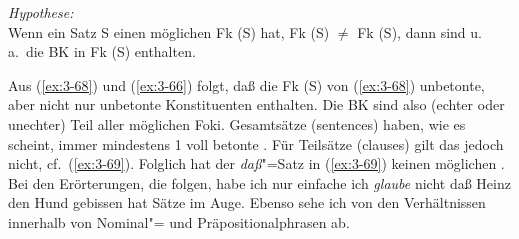 \documentclass[output=paper]{langsci/langscibook}
\begin{document}
\begin{exe}
\ex
\label{ex:3-68}
\textit{Hypothese:}\\
Wenn ein Satz S einen möglichen  Fk (S) hat, Fk (S) $\neq$ Fk (S), dann sind u.\,a.\ die BK in Fk (S)
enthalten.
\end{exe}
Aus (\ref{ex:3-68}) und (\ref{ex:3-66}) folgt, daß die Fk (S) von (\ref{ex:3-68}) unbetonte,
aber nicht nur unbetonte Konstituenten enthalten. Die BK sind also
(echter oder unechter) Teil aller möglichen Foki. Gesamtsätze
(sentences) haben, wie es scheint, immer mindestens 1 voll betonte
. Für Teilsätze (clauses) gilt das jedoch nicht,
cf.\ (\ref{ex:3-69}). Folglich hat der \textit{daß}"=Satz in (\ref{ex:3-69}) keinen möglichen
. Bei den Erörterungen, die folgen, habe ich nur einfache
\ea
\label{ex:3-69}
ich \textit{glaube} nicht daß Heinz den Hund gebissen hat
\z
Sätze im Auge. Ebenso sehe ich von den Verhältnissen innerhalb von
Nominal"= und Präpositionalphrasen ab.
\end{document}
